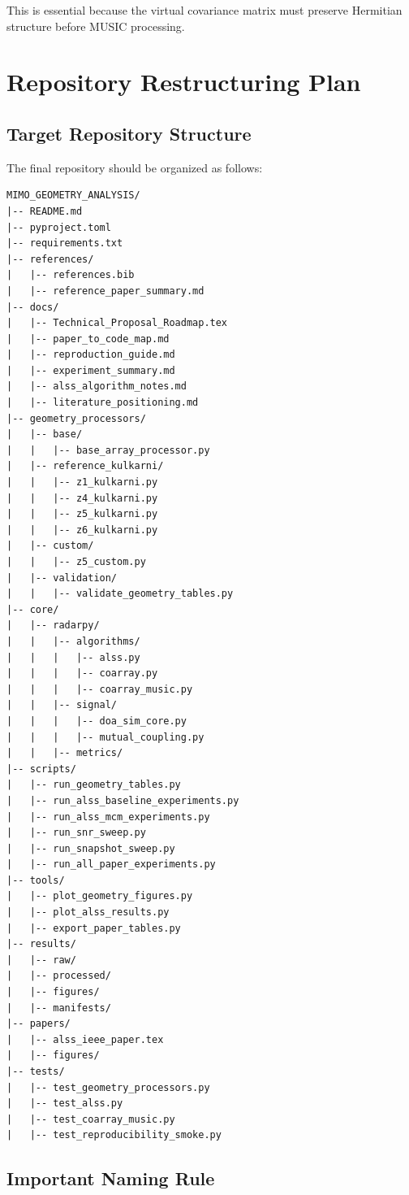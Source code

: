 \documentclass[11pt,letterpaper]{article}
\begin{document}
This is essential because the virtual covariance matrix must preserve Hermitian structure before MUSIC processing.

\section{Repository Restructuring Plan}

\subsection{Target Repository Structure}

The final repository should be organized as follows:

\begin{lstlisting}
MIMO_GEOMETRY_ANALYSIS/
|-- README.md
|-- pyproject.toml
|-- requirements.txt
|-- references/
|   |-- references.bib
|   |-- reference_paper_summary.md
|-- docs/
|   |-- Technical_Proposal_Roadmap.tex
|   |-- paper_to_code_map.md
|   |-- reproduction_guide.md
|   |-- experiment_summary.md
|   |-- alss_algorithm_notes.md
|   |-- literature_positioning.md
|-- geometry_processors/
|   |-- base/
|   |   |-- base_array_processor.py
|   |-- reference_kulkarni/
|   |   |-- z1_kulkarni.py
|   |   |-- z4_kulkarni.py
|   |   |-- z5_kulkarni.py
|   |   |-- z6_kulkarni.py
|   |-- custom/
|   |   |-- z5_custom.py
|   |-- validation/
|   |   |-- validate_geometry_tables.py
|-- core/
|   |-- radarpy/
|   |   |-- algorithms/
|   |   |   |-- alss.py
|   |   |   |-- coarray.py
|   |   |   |-- coarray_music.py
|   |   |-- signal/
|   |   |   |-- doa_sim_core.py
|   |   |   |-- mutual_coupling.py
|   |   |-- metrics/
|-- scripts/
|   |-- run_geometry_tables.py
|   |-- run_alss_baseline_experiments.py
|   |-- run_alss_mcm_experiments.py
|   |-- run_snr_sweep.py
|   |-- run_snapshot_sweep.py
|   |-- run_all_paper_experiments.py
|-- tools/
|   |-- plot_geometry_figures.py
|   |-- plot_alss_results.py
|   |-- export_paper_tables.py
|-- results/
|   |-- raw/
|   |-- processed/
|   |-- figures/
|   |-- manifests/
|-- papers/
|   |-- alss_ieee_paper.tex
|   |-- figures/
|-- tests/
|   |-- test_geometry_processors.py
|   |-- test_alss.py
|   |-- test_coarray_music.py
|   |-- test_reproducibility_smoke.py
\end{lstlisting}

\subsection{Important Naming Rule}
\end{document}
